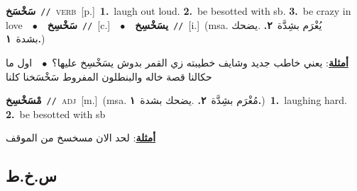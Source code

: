 \documentclass[10pt,a4paper,twoside]{article} %
\begin{document}
\begin{multicols}{2}
{\setlength\topsep{0pt}\textbf{\foreignlanguage{arabic}{سَخْسَخ}}\ {\color{gray}\texttt{//}\color{black}}\ \textsc{verb}\ [p.]\ \textbf{1.}~laugh out loud.  \textbf{2.}~be besotted with sb.  \textbf{3.}~be crazy in love\ \ $\bullet$\ \ \setlength\topsep{0pt}\textbf{\foreignlanguage{arabic}{سَخْسِخ}}\ {\color{gray}\texttt{//}\color{black}}\ [c.]\ \ $\bullet$\ \ \setlength\topsep{0pt}\textbf{\foreignlanguage{arabic}{يسَخْسِخ}}\ {\color{gray}\texttt{//}\color{black}}\ [i.]\ \color{gray}(msa. \foreignlanguage{arabic}{يُغْرَم بشِدَّة}~\foreignlanguage{arabic}{\textbf{٢.}}  .\foreignlanguage{arabic}{يضحك بشدة}~\foreignlanguage{arabic}{\textbf{١.}})\color{black}\  \begin{flushright}\color{gray}\foreignlanguage{arabic}{\textbf{\underline{\foreignlanguage{arabic}{أمثلة}}}: يعني خاطب جديد وشايف خطيبته زي القمر بدوش يسَخْسِخ عليها؟\ $\bullet$\ \  اول ما حكالنا قصة خاله والبنطلون المفروط سَخْسَخنا كلنا}\end{flushright}\color{black}} \vspace{2mm}

{\setlength\topsep{0pt}\textbf{\foreignlanguage{arabic}{مْسَخْسِخ}}\ {\color{gray}\texttt{//}\color{black}}\ \textsc{adj}\ [m.]\ \color{gray}(msa. \foreignlanguage{arabic}{مُغْرَم بشِدَّة}~\foreignlanguage{arabic}{\textbf{٢.}}  .\foreignlanguage{arabic}{يضحك بشدة}~\foreignlanguage{arabic}{\textbf{١.}})\color{black}\ \textbf{1.}~laughing hard.  \textbf{2.}~be besotted with sb\  \begin{flushright}\color{gray}\foreignlanguage{arabic}{\textbf{\underline{\foreignlanguage{arabic}{أمثلة}}}: لحد الان مسخسخ من الموقف}\end{flushright}\color{black}} \vspace{2mm}

\vspace{-3mm}
\subsection*{\color{blue}\foreignlanguage{arabic}{س.خ.ط}\color{blue}{}} 


\end{multicols}
\end{document}
